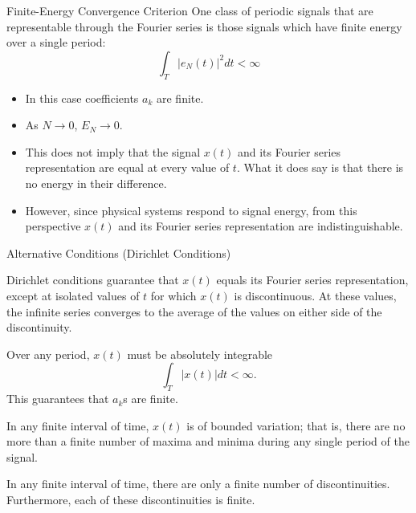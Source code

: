 \begin{frame}{Finite-Energy Convergence Criterion}
    One class of periodic signals that are representable through the Fourier series is those signals which have finite energy over a single period:
    \begin{equation}
        \int_T \left|e_N(t)\right|^2 dt < \infty
    \end{equation}

    \begin{itemize}[<+->]
        \item In this case coefficients $a_k$ are finite.
        \item As $N\rightarrow 0$, $E_N \rightarrow 0$.
        \item This \alert{does not imply that the signal $x(t)$ and its Fourier series representation are equal at every value of $t$}. What it does say is that there is no energy in their difference.
        \item However, since physical systems respond to signal energy, from this perspective $x(t)$ and its Fourier series representation are indistinguishable.
    \end{itemize}
\end{frame}

\begin{frame}{Alternative Conditions (Dirichlet Conditions)}

    Dirichlet conditions guarantee that $x(t)$ \alert{equals} its Fourier series representation, except at isolated values of $t$ for which $x(t)$ is discontinuous. At these values, the infinite series converges to the average of the values on either side of the discontinuity.\\[10pt]


    Over any period, $x(t)$ must be absolutely integrable
    \begin{equation}
        \int_T \left|x(t)\right| dt < \infty.
    \end{equation}
    This guarantees that $a_k$s are finite. \\[10pt]




    In any finite interval of time, $x(t)$ is of bounded variation; that is, there are no more than a finite number of maxima and minima during any single period of the signal. \\[10pt]



    In any finite interval of time, there are only a finite number of discontinuities. Furthermore, each of these discontinuities is finite.

\end{frame}

